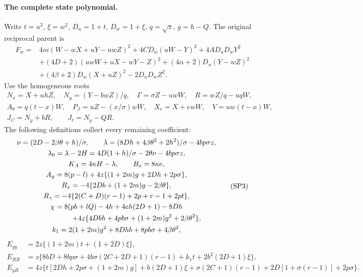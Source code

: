 \paragraph{The complete state polynomial.}
Write $t=u^2$, $\xi=w^2$, $D_u=1+t$, $D_w=1+\xi$, $q=\sqrt z$,
$g=h-Q$.  The original reciprocal parent is
\[
\begin{split}
 F_w={}&4m(W-wX+uY-uwZ)^2+4CD_w(uW-Y)^2+4AD_uD_wY^2\\
 &+(4D+2)(uwW+uX-wY-Z)^2+(4\alpha+2)D_u(Y-wZ)^2\\
 &+(4\beta+2)D_w(X+uZ)^2-2D_uD_wZ^2.
\end{split}\tag{P4}\label{eq:c1-reciprocal-parent}
\]
Use the homogeneous roots
\[
\begin{gathered}
 N_x=X+uhZ,\quad N_y=(Y-bwZ)/q,\quad
 \Gamma=\sigma Z-uwW,\quad R=wZ/q-uqW,\\
 A_\theta=q(t-x)W,\quad P_\beta=uZ-(x/\sigma)wW,
 \quad X_e=X+ewW,\quad V=uw(t-x)W,\\
 J_C=N_y+bR,\qquad J_\ell=N_y-QR.
\end{gathered}
\]
The following definitions collect every remaining coefficient:
\[
\begin{gathered}
 \nu=(2D-2\beta\theta+h)/\sigma,\qquad
 \lambda=(8Dh+4\beta\theta^2+2h^2)/\sigma-4bp\sigma z,\\
 \lambda_0=\lambda-2H=4D(1+h)/\sigma-2\theta\nu-4bp\sigma z,\\
 K_A=4\kappa H-\lambda,\qquad B_x=8\kappa e,\\
 A_y=8(p-l)+4z\{(1+2m)g+2Dh+2p\sigma\},\\
 R_x=-4\{2Db+(1+2m)g-2\beta\theta\},\\
 R_\gamma=-4\{2(C+D)(r-1)+2p+r-1+2pt\},\\
 \chi=8(pb+lQ)-4h+4eh(2D+1)-8Dh\\
 \hspace{20mm}+4z\{4Dbh+4pb\sigma+(1+2m)g^2+2\beta\theta^2\},\\
 k_1=2(1+2m)g^2+8Dhb+8pb\sigma+4\beta\theta^2,
\end{gathered}\tag{SP3}\label{eq:c1-contact-coefficients}
\]
\[
\begin{split}
 E_{yy}&=2z\{(1+2m)t+(1+2D)\xi\},\\
 E_{RR}&=z\{8bD+8bp\sigma+4b\sigma(2C+2D+1)(r-1)
                                  +k_1t+2b^2(2D+1)\xi\},\\
 E_{yR}&=4z\{t[2Dh+2p\sigma+(1+2m)g]+b(2D+1)\xi
       +\sigma(2C+1)(r-1)+2D[1+\sigma(r-1)]+2p\sigma\}.
\end{split}
\]
